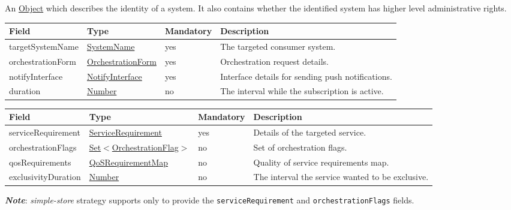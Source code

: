 \documentclass[a4paper]{arrowhead}
\newcommand{\pref}[1]{{\textcolor{ArrowheadGrey}{\hyperref[sec:model:primitives:#1]{#1}}}}
\begin{document}

An \pref{Object} which describes the identity of a system. It also contains whether the identified system has higher level administrative rights.


\begin{table}[ht!]
\begin{tabularx}{\textwidth}{| p{3.2cm} | p{3.5cm} | p{2cm} | X |} \hline
\rowcolor{gray!33} Field & Type & Mandatory & Description \\ \hline
targetSystemName & \pref{SystemName} & yes & The targeted consumer system. \\ \hline
orchestrationForm & \hyperref[sec:model:OrchestrationForm]{OrchestrationForm} & yes & Orchestration request details. \\ \hline
notifyInterface & \hyperref[sec:model:NotifyInterface]{NotifyInterface} & yes & Interface details for sending push notifications. \\ \hline
duration & \pref{Number} & no & The interval while the subscription is active.  \\ \hline
\end{tabularx}
\end{table}


\begin{table}[ht!]
\begin{tabularx}{\textwidth}{| p{3.25cm} | p{3.8cm} | p{2cm} | X |} \hline
\rowcolor{gray!33} Field & Type & Mandatory & Description \\ \hline
serviceRequirement & \hyperref[sec:model:ServiceRequirement]{ServiceRequirement} & yes & Details of the targeted service. \\ \hline
orchestrationFlags & \pref{Set}$<$\hyperref[sec:model:OrchestrationFlag]{OrchestrationFlag}$>$ & no & Set of orchestration flags. \\ \hline
qosRequirements & \hyperref[sec:model:QoSRequirementMap]{QoSRequirementMap} & no & Quality of service requirements map. \\ \hline
exclusivityDuration & \pref{Number} & no & The interval the service wanted to be exclusive.  \\ \hline
\end{tabularx}
\end{table}

\textbf{\textit{Note}}: \textit{simple-store} strategy supports only to provide the \texttt{serviceRequirement} and \texttt{orchestrationFlags} fields. 
\end{document}

